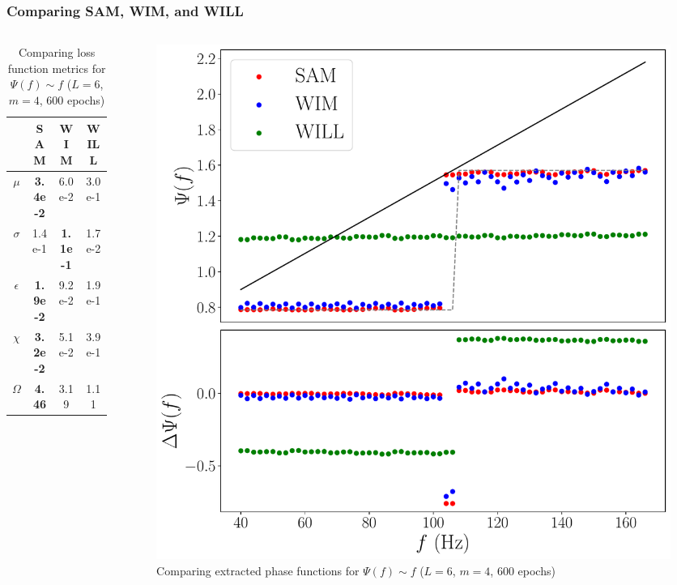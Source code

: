 \documentclass{beamer}
\begin{document}
\begin{frame}
\frametitle{Comparing SAM, WIM, and WILL}
\begin{columns}
\begin{column}{0.5\textwidth}
\begin{table}
\begin{tabular}{c || c| c| c }
& SAM & WIM & WILL \\ \hline \hline 
$\mu$ &  \textbf{3.4e-2} & 6.0e-2 & 3.0e-1 \\
$\sigma$ &  1.4e-1 &\textbf{ 1.1e-1} & 1.7e-2\\
$\epsilon$  &  \textbf{1.9e-2} & 9.2e-2 & 1.9e-1\\
$\chi$ & \textbf{ 3.2e-2} & 5.1e-2  & 3.9e-1  \\ \hline 
$\Omega$ &  \textbf{4.46} & 3.19 & 1.11
\end{tabular}
\caption{Comparing loss function metrics for $\Psi(f) \sim f$ ($L=6$, $m=4$, 600 epochs)}
\end{table}
\end{column}
\begin{column}{0.5\textwidth}
\begin{figure}
\centering 
\includegraphics[width=\textwidth]{im/SAM_WIM_WILL_F}
\caption{Comparing extracted phase functions for $\Psi(f) \sim f$ ($L=6$, $m=4$, 600 epochs)}
\end{figure}
\end{column}
\end{columns}
\end{frame}
\end{document}
